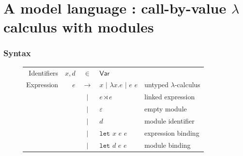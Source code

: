 \documentclass{beamer}
\theoremstyle{definition}
\newcommand*{\vbar}{|}
\newcommand*{\ExprVar}{\mathsf{Var}}
\newcommand*{\modid}{d}
\newcommand*{\link}[2]{{#1}\rtimes{#2}}
\newcommand*{\Let}{\mathtt{let}}
\begin{document}
\section{A model language : call-by-value \texorpdfstring{$\lambda$}{a} calculus with modules}
\begin{frame}[c]
  \frametitle{Syntax}
  \begin{figure}[h!]
    \centering
    \begin{tabular}{rrcll}
      Identifiers & $x,\modid$ & $\in$         & $\ExprVar$                                                             \\
      Expression  & $e$        & $\rightarrow$ & $x$ $\vbar$ $\lambda x.e$ $\vbar$ $e$ $e$ & untyped $\lambda$-calculus \\
                  &            & $\vbar$       & $\link{e}{e}$                             & linked expression          \\
                  &            & $\vbar$       & $\varepsilon$                             & empty module               \\
                  &            & $\vbar$       & $\modid$                                  & module identifier          \\
                  &            & $\vbar$       & $\Let$ $x$ $e$ $e$                        & expression binding         \\
                  &            & $\vbar$       & $\Let$ $\modid$ $e$ $e$                   & module binding             \\
    \end{tabular}
  \end{figure}
\end{frame}
\end{document}
